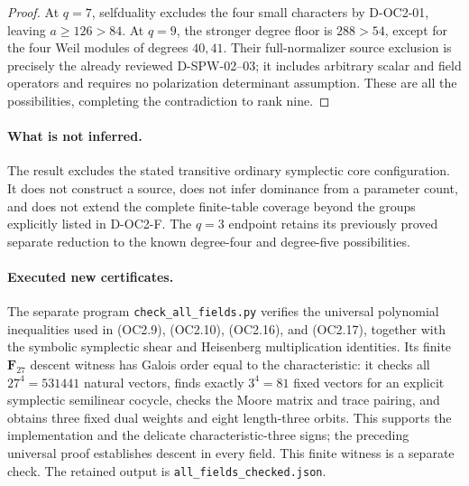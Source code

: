 \begin{proof}
At $q=7$, selfduality excludes the four small characters by
D-OC2-01, leaving $a\ge126>84$. At $q=9$, the stronger
degree floor is $288>54$, except for the four Weil modules
of degrees $40,41$. Their full-normalizer source exclusion
is precisely the already reviewed D-SPW-02--03; it includes
arbitrary scalar and field operators and requires no
polarization determinant assumption. These are all the
possibilities, completing the contradiction to rank nine.
\end{proof}

\paragraph{What is not inferred.}
The result excludes the stated transitive ordinary symplectic
core configuration. It does not construct a source, does not
infer dominance from a parameter count, and does not extend
the complete finite-table coverage beyond the groups explicitly
listed in D-OC2-F. The $q=3$ endpoint retains its previously
proved separate reduction to the known degree-four and
degree-five possibilities.

\paragraph{Executed new certificates.}
The separate program \texttt{check\_all\_fields.py} verifies the
universal polynomial inequalities used in (OC2.9), (OC2.10),
(OC2.16), and (OC2.17), together with the symbolic symplectic
shear and Heisenberg multiplication identities. Its finite
$\mathbf F_{27}$ descent witness has Galois order equal to the
characteristic: it checks all $27^4=531441$ natural vectors,
finds exactly $3^4=81$ fixed vectors for an explicit symplectic
semilinear cocycle, checks the Moore matrix and trace pairing,
and obtains three fixed dual weights and eight length-three
orbits. This supports the implementation and the delicate
characteristic-three signs; the preceding universal proof
establishes descent in every field. This finite witness is a
separate check. The retained output is
\texttt{all\_fields\_checked.json}.
